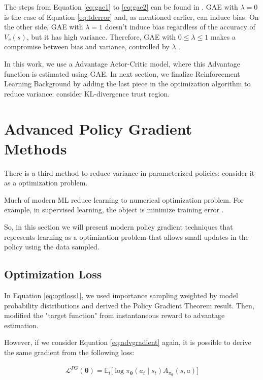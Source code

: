 The steps from Equation \ref{eq:gae1} to \ref{eq:gae2} can be found in \cite{DBLP:journals/corr/SchulmanMLJA15}. GAE with $\lambda = 0$ is the case of Equation \ref{eq:tderror} and, as mentioned earlier, can induce bias. On the other side, GAE with $\lambda = 1$ doesn't induce bias regardless of the accuracy of $V_{v}(s)$, but it has high variance. Therefore, GAE with $0 \leq \lambda \leq 1$ makes a compromise between bias and variance, controlled by $\lambda$ \cite{DBLP:journals/corr/SchulmanMLJA15}.

In this work, we use a Advantage Actor-Critic model, where this Advantage function is estimated using GAE. In next section, we finalize Reinforcement Learning Background by adding the last piece in the optimization algorithm to reduce variance: consider KL-divergence trust region.

\section{Advanced Policy Gradient Methods}
There is a third method to reduce variance in parameterized policies: consider it as a optimization problem.

Much of modern ML reduce learning to numerical optimization problem. For example, in supervised learning, the object is minimize training error \cite{deeprlbootcamplec5}.

So, in this section we will present modern policy gradient techniques that represents learning as a optimization problem that allows small updates in the policy using the data sampled.

\subsection{Optimization Loss}
In Equation \ref{eq:optloss1}, we used importance sampling weighted by model probability distributions and derived the Policy Gradient Theorem result. Then, modified the "target function" from instantaneous reward to advantage estimation.

However, if we consider Equation \ref{eq:advgradient} again, it is possible to derive the same gradient from the following loss:

\begin{eqnarray}\label{eq:logprobloss}
\mathcal{L}^{PG}(\boldsymbol{\theta}) = \mathbb{E}_{t}\Big[\log{\pi_{\boldsymbol{\theta}}} (a_{t} \mid s_{t} )A_{\pi_{\boldsymbol{\theta}}}(s,a)\Big]
\end{eqnarray}

